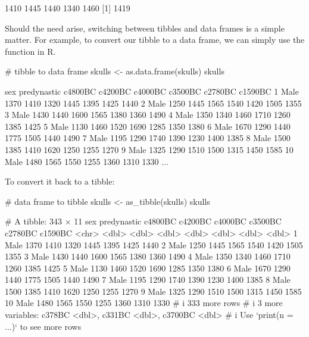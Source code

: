 \begin{outR}
[1] 1410 1445 1440 1340 1460
[1] 1419
\end{outR}

Should the need arise, switching between tibbles and data frames is a simple matter. For example, to convert our tibble  to a data frame, we can simply use the  function in R.

\begin{inR}
# tibble to data frame
skulls <- as.data.frame(skulls)
skulls
\end{inR}
\begin{outR}
   sex  predynastic c4800BC c4200BC c4000BC c3500BC c2780BC c1590BC
1  Male        1370    1410    1320    1445    1395    1425    1440
2  Male        1250    1445    1565    1540    1420    1505    1355
3  Male        1430    1440    1600    1565    1380    1360    1490
4  Male        1350    1340    1460    1710    1260    1385    1425
5  Male        1130    1460    1520    1690    1285    1350    1380
6  Male        1670    1290    1440    1775    1505    1440    1490
7  Male        1195    1290    1740    1390    1230    1400    1385
8  Male        1500    1385    1410    1620    1250    1255    1270
9  Male        1325    1290    1510    1500    1315    1450    1585
10 Male        1480    1565    1550    1255    1360    1310    1330
...
\end{outR}

\noindent
To convert it back to a tibble:
\begin{inR}
# data frame to tibble
skulls <- as_tibble(skulls)
skulls
\end{inR}
\begin{outR}
# A tibble: 343 × 11
   sex   predynastic c4800BC c4200BC c4000BC c3500BC c2780BC c1590BC
   <chr>       <dbl>   <dbl>   <dbl>   <dbl>   <dbl>   <dbl>   <dbl>
 1 Male         1370    1410    1320    1445    1395    1425    1440
 2 Male         1250    1445    1565    1540    1420    1505    1355
 3 Male         1430    1440    1600    1565    1380    1360    1490
 4 Male         1350    1340    1460    1710    1260    1385    1425
 5 Male         1130    1460    1520    1690    1285    1350    1380
 6 Male         1670    1290    1440    1775    1505    1440    1490
 7 Male         1195    1290    1740    1390    1230    1400    1385
 8 Male         1500    1385    1410    1620    1250    1255    1270
 9 Male         1325    1290    1510    1500    1315    1450    1585
10 Male         1480    1565    1550    1255    1360    1310    1330
# i 333 more rows
# i 3 more variables: c378BC <dbl>, c331BC <dbl>, c3700BC <dbl>
# i Use `print(n = ...)` to see more rows
\end{outR}

